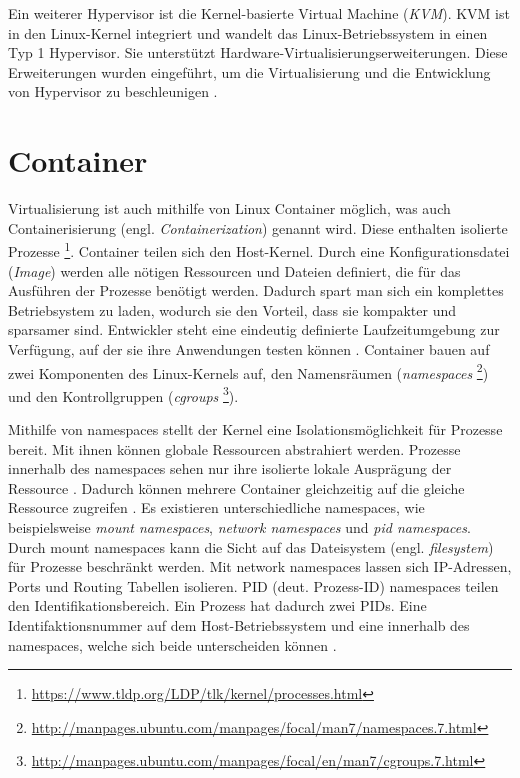 Ein weiterer Hypervisor ist die Kernel-basierte Virtual Machine (\emph{KVM}).
KVM ist in den Linux-Kernel integriert und wandelt
das Linux-Betriebssystem in einen Typ 1 Hypervisor. Sie unterstützt
Hardware-Virtualisierungserweiterungen. Diese Erweiterungen wurden eingeführt,
um die Virtualisierung und die Entwicklung von Hypervisor
zu beschleunigen \cite{IBMHypervisor} \cite{RedHatKVM}.

\section{Container}
Virtualisierung ist auch mithilfe von Linux Container möglich,
was auch Containerisierung (engl. \emph{Containerization})
genannt wird. Diese enthalten isolierte Prozesse
\footnote{\url{https://www.tldp.org/LDP/tlk/kernel/processes.html}}.
Container teilen sich den Host-Kernel. Durch eine
Konfigurationsdatei (\emph{Image}) werden alle
nötigen Ressourcen und Dateien definiert, die für das Ausführen
der Prozesse benötigt werden. Dadurch spart man sich ein komplettes
Betriebsystem zu laden, wodurch sie den Vorteil,
dass sie kompakter und sparsamer sind. Entwickler steht eine eindeutig
definierte Laufzeitumgebung zur Verfügung, auf der sie ihre Anwendungen testen
können \cite{RedHatContainer}. Container bauen auf zwei Komponenten
des Linux-Kernels auf, den Namensräumen
(\emph{namespaces} \footnote{\url{http://manpages.ubuntu.com/manpages/focal/man7/namespaces.7.html}})
und den Kontrollgruppen
(\emph{cgroups} \footnote{\url{http://manpages.ubuntu.com/manpages/focal/en/man7/cgroups.7.html}}).

Mithilfe von namespaces stellt der Kernel eine Isolationsmöglichkeit
für Prozesse bereit. Mit ihnen können globale Ressourcen abstrahiert werden.
Prozesse innerhalb des namespaces sehen nur ihre isolierte lokale
Ausprägung der Ressource \cite{UbuntuNamespaces}.
Dadurch können mehrere Container gleichzeitig auf die gleiche
Ressource zugreifen \cite{RedHatIntroToLinuxContainers}.
Es existieren unterschiedliche namespaces, wie beispielsweise
\emph{mount namespaces}, \emph{network namespaces}
und \emph{pid namespaces}.
Durch mount namespaces kann die Sicht auf das Dateisystem
(engl. \emph{filesystem}) für Prozesse beschränkt werden.
Mit network namespaces lassen sich IP-Adressen, Ports
und Routing Tabellen isolieren. PID (deut. Prozess-ID) namespaces teilen
den Identifikationsbereich. Ein Prozess hat dadurch zwei
PIDs. Eine Identifaktionsnummer auf dem Host-Betriebssystem und eine
innerhalb des namespaces, welche sich beide unterscheiden können
\cite{LwnDotNetNamespaces}.

